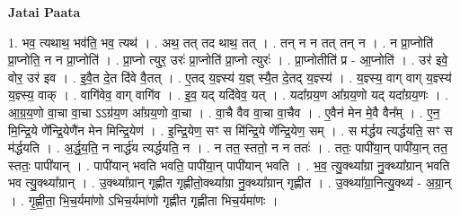 \documentclass[17pt]{extarticle}
\begin{document}
\textbf{Jatai Paata} \newline

1. भव॒ त्यथाथ॒ भव॑ति॒ भव॒ त्यथ॑ । . अथ॒ तत् तद थाथ॒ तत् । . तन् न न तत् तन् न । . न प्रा॒प्नोति॑ प्रा॒प्नोति॒ न न प्रा॒प्नोति॑ । . प्रा॒प्नो त्युर॒ उरः॑ प्रा॒प्नोति॑ प्रा॒प्नो त्युरः॑ । . प्रा॒प्नोतीति॑ प्र - आ॒प्नोति॑ । . उर॑ इवे॒ वोर॒ उर॑ इव । . इ॒वै॒त दे॒त दि॑वे वै॒तत् । . ए॒तद् य॒ज्ञ्स्य॑ य॒ज्ञ् स्यै॒त दे॒तद् य॒ज्ञ्स्य॑ । . य॒ज्ञ्स्य॒ वाग् वाग् य॒ज्ञ्स्य॑ य॒ज्ञ्स्य॒ वाक् । . वागि॑वेव॒ वाग् वागि॑व । . इ॒व॒ यद् यदि॑वेव॒ यत् । . यदा᳚ग्रय॒ण आ᳚ग्रय॒णो यद् यदा᳚ग्रय॒णः । . आ॒ग्र॒य॒णो वा॒चा वा॒चा ऽऽग्र॑य॒ण आ᳚ग्रय॒णो वा॒चा । . वा॒चै वैव वा॒चा वा॒चैव । . ए॒वैन॑ मेन मे॒वै वैन᳚म् । . ए॒न॒ मि॒न्द्रि॒ये णे᳚न्द्रि॒येणै॑न मेन मिन्द्रि॒येण॑ । . इ॒न्द्रि॒येण॒ सꣳ स मि॑न्द्रि॒ये णे᳚न्द्रि॒येण॒ सम् । . स म॑र्द्धय त्यर्द्धयति॒ सꣳ स म॑र्द्धयति । . अ॒र्द्ध॒य॒ति॒ न नार्द्ध॑य त्यर्द्धयति॒ न । . न तत॒ स्ततो॒ न न ततः॑ । . ततः॒ पापी॑या॒न् पापी॑या॒न् तत॒ स्ततः॒ पापी॑यान् । . पापी॑यान् भवति भवति॒ पापी॑या॒न् पापी॑यान् भवति । . भ॒व॒ त्यु॒क्थ्या᳚ग्रा नु॒क्थ्या᳚ग्रान् भवति भव त्यु॒क्थ्या᳚ग्रान् । . उ॒क्थ्या᳚ग्रान् गृह्णीत गृह्णीतो॒क्थ्या᳚ग्रा नु॒क्थ्या᳚ग्रान् गृह्णीत । . उ॒क्थ्या᳚ग्रा॒नित्यु॒क्थ्य॑ - अ॒ग्रा॒न् । . गृ॒ह्णी॒ता॒ भि॒च॒र्यमा॑णो ऽभिच॒र्यमा॑णो गृह्णीत गृह्णीता भिच॒र्यमा॑णः । \newline
\end{document}
